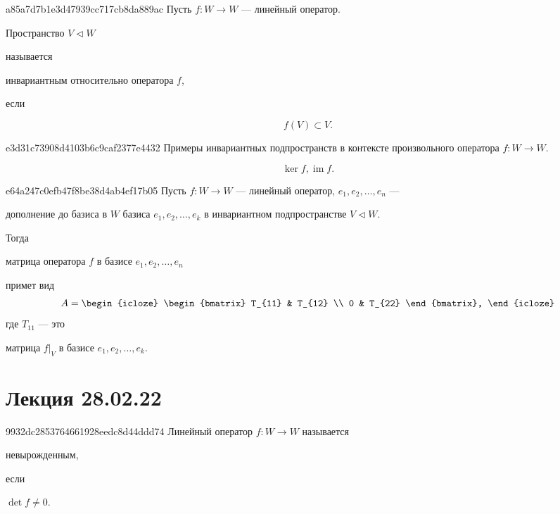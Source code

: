\begin{note}{a85a7d7b1e3d47939cc717cb8da889ac}
    Пусть \( f : W \to W \) --- линейный оператор. \begin{icloze}{1}Пространство \( V \triangleleft W \)\end{icloze} называется \begin{icloze}{2}инвариантным относительно оператора \( f \),\end{icloze} если
    \begin{icloze}{1}\[
        f(V) \subset V.
    \]\end{icloze}
\end{note}

\begin{note}{e3d31c73908d4103b6c9caf2377e4432}
    Примеры инвариантных подпространств в контексте произвольного оператора \( f : W \to W \).

    \begin{cloze}{1}
        \[
            \ker f, \operatorname{im} f.
        \]
    \end{cloze}
\end{note}

\begin{note}{e64a247c0efb47f8be38d4ab4ef17b05}
    Пусть \( f : W \to W \) --- линейный оператор,  \( e_1,e_2, \ldots, e_n  \) --- \begin{icloze}{4}дополнение до базиса в \( W \) базиса \( e_1,e_2, \ldots, e_k  \) в инвариантном подпространстве \( V \triangleleft W \).\end{icloze} Тогда \begin{icloze}{3}матрица оператора \( f \) в базисе \( e_1,e_2, \ldots, e_n  \)\end{icloze} примет вид
    \[
        A = \begin{icloze}{1}
            \begin{bmatrix}
                T_{11} & T_{12} \\
                0 & T_{22}
            \end{bmatrix},
        \end{icloze}
    \]
    где \( T_{11}  \) --- это \begin{icloze}{2}матрица \( f |_{V}  \) в базисе \( e_1,e_2, \ldots, e_k  \).\end{icloze}
\end{note}

\section{Лекция 28.02.22}
\begin{note}{9932dc2853764661928eedc8d44ddd74}
    Линейный оператор \( f : W \to W \) называется \begin{icloze}{2}невырожденным,\end{icloze} если \begin{icloze}{1}\( \det f \neq 0 \).\end{icloze}
\end{note}


